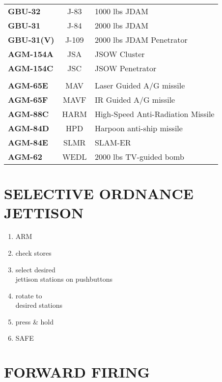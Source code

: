 \documentclass[fontInter]{TechCheck}
\begin{document}
\begin{center}
\begin{tabular}{l | c | p{6cm}}
			\textbf{GBU-32} & J-83 & 1000 lbs JDAM \\
			\textbf{GBU-31} & J-84 & 2000 lbs JDAM \\
			\textbf{GBU-31(V)} & J-109 & 2000 lbs JDAM Penetrator \\
			\midrule
			\textbf{AGM-154A} & JSA & JSOW Cluster \\
			\textbf{AGM-154C} & JSC & JSOW Penetrator \\
			\midrule
			\multicolumn{3}{c}{\blue{A/G Missiles}} \\
			\midrule
			\textbf{AGM-65E} & MAV & Laser Guided A/G missile\\
			\textbf{AGM-65F} & MAVF & IR Guided A/G missile\\
			\midrule
			\textbf{AGM-88C} & HARM & High-Speed Anti-Radiation Missile\\
			\midrule
			\textbf{AGM-84D} & HPD & Harpoon anti-ship missile \\
			\textbf{AGM-84E} & SLMR & SLAM-ER \\
			\midrule
			\textbf{AGM-62} & WEDL & 2000 lbs TV-guided bomb \\
			\bottomrule
		\end{tabular}
	\end{center}

	\clearpage

	\section{SELECTIVE ORDNANCE JETTISON}
	\begin{enumerate}
		\item {}\dotfill ARM
		\item {}\dotfill check stores
		\item {}\dotfill select desired \\ \hfill jettison stations on pushbuttons
		\item {}\dotfill rotate to \\ \hfill desired stations
		\item {}\dotfill press \& hold
		\item {}\dotfill SAFE
	\end{enumerate}

	\section{FORWARD FIRING}
\end{document}
